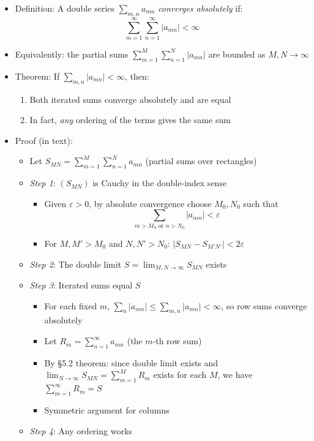 \documentclass[
  10pt,
  letterpaper,
]{scrbook}
\providecommand{\tightlist}{%
  \setlength{\itemsep}{0pt}\setlength{\parskip}{0pt}}
\begin{document}
\begin{itemize}
\tightlist
\item
  Definition: A double series \(\sum_{m,n} a_{mn}\) \emph{converges
  absolutely} if:
  \[\sum_{m=1}^{\infty} \sum_{n=1}^{\infty} |a_{mn}| < \infty\]
\item
  Equivalently: the partial sums
  \(\sum_{m=1}^{M} \sum_{n=1}^{N} |a_{mn}|\) are bounded as
  \(M, N \to \infty\)
\item
  Theorem: If \(\sum_{m,n} |a_{mn}| < \infty\), then:

  \begin{enumerate}
  \def\labelenumi{\arabic{enumi}.}
  \tightlist
  \item
    Both iterated sums converge absolutely and are equal
  \item
    In fact, \emph{any} ordering of the terms gives the same sum
  \end{enumerate}
\item
  Proof (in text):

  \begin{itemize}
  \tightlist
  \item
    Let \(S_{MN} = \sum_{m=1}^{M} \sum_{n=1}^{N} a_{mn}\) (partial sums
    over rectangles)
  \item
    \emph{Step 1}: \((S_{MN})\) is Cauchy in the double-index sense

    \begin{itemize}
    \tightlist
    \item
      Given \(\varepsilon > 0\), by absolute convergence choose
      \(M_0, N_0\) such that
      \[\sum_{m > M_0 \text{ or } n > N_0} |a_{mn}| < \varepsilon\]
    \item
      For \(M, M' > M_0\) and \(N, N' > N_0\):
      \(|S_{MN} - S_{M'N'}| < 2\varepsilon\)
    \end{itemize}
  \item
    \emph{Step 2}: The double limit \(S = \lim_{M,N \to \infty} S_{MN}\)
    exists
  \item
    \emph{Step 3}: Iterated sums equal \(S\)

    \begin{itemize}
    \tightlist
    \item
      For each fixed \(m\),
      \(\sum_n |a_{mn}| \leq \sum_{m,n} |a_{mn}| < \infty\), so row sums
      converge absolutely
    \item
      Let \(R_m = \sum_{n=1}^{\infty} a_{mn}\) (the \(m\)-th row sum)
    \item
      By §5.2 theorem: since double limit exists and
      \(\lim_{N \to \infty} S_{MN} = \sum_{m=1}^{M} R_m\) exists for
      each \(M\), we have \(\sum_{m=1}^{\infty} R_m = S\)
    \item
      Symmetric argument for columns
    \end{itemize}
  \item
    \emph{Step 4}: Any ordering works


\end{itemize}
\end{itemize}
\end{document}
